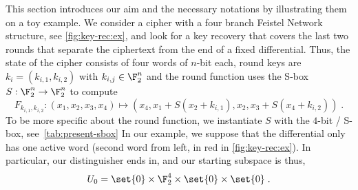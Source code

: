 This section introduces our aim and the necessary notations by illustrating them on a toy example.
We consider a cipher with a four branch Feistel Network structure, see \cref{fig:key-rec:ex}, and look for a key recovery that covers the last two rounds that separate the ciphertext from the end of a fixed differential.
Thus, the state of the cipher consists of four words of $n$-bit each, round keys are $k_i = (k_{i,1}, k_{i,2})$ with $k_{i,j} \in \F_2^n$ and the round function uses the S-box $S : \F_2^n \to \F_2^n$ to compute
\begin{equation*}
    F_{k_{i,1}, k_{i,2}} : (x_1, x_2, x_3, x_4) \mapsto (x_4, x_1 + S(x_2 + k_{i,1}), x_2, x_3 + S(x_4 + k_{i,2}))\;.
\end{equation*}
To be more specific about the round function, we instantiate $S$ with the $4$-bit \present/ S-box, see~\cref{tab:present-sbox}
In our example, we suppose that the differential only has one active word (second word from left, in red in \cref{fig:key-rec:ex}).
In particular, our distinguisher ends in, and our starting subspace is thus,
\begin{equation*}
    U_0 = \set{0} \times \F_2^4 \times \set{0} \times \set{0}\;.
\end{equation*}


